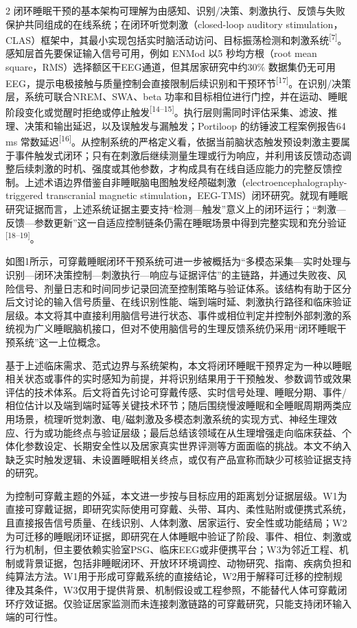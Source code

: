 \documentclass[UTF8,zihao=5,fontset=none]{ctexart}
\newcommand{\hei}{\CJKfamily{hei}}
\newcommand{\leveltwo}[1]{%
  \par\noindent{\hei\fontsize{10.5pt}{15.6pt}\selectfont\bfseries #1\par}}
\newcommand{\refcite}[1]{\nolinebreak[4]\textsuperscript{[#1]}}
\begin{document}
\begin{multicols}{2}
闭环睡眠干预的基本架构可理解为由感知、识别/决策、刺激执行、反馈与失败保护共同组成的在线系统；在闭环听觉刺激（closed-loop auditory stimulation，CLAS）框架中，其最小实现包括实时脑活动访问、目标振荡检测和刺激系统\refcite{7}。感知层首先要保证输入信号可用，例如 ENMod 以5 秒均方根（root mean square，RMS）选择额区干EEG通道，但其居家研究中约30\% 数据集仍无可用EEG，提示电极接触与质量控制会直接限制后续识别和干预环节\refcite{17}。在识别/决策层，系统可联合NREM、SWA、beta 功率和目标相位进行门控，并在运动、睡眠阶段变化或觉醒时拒绝或停止触发\refcite{14--15}。执行层则需同时评估采集、滤波、推理、决策和输出延迟，以及误触发与漏触发；Portiloop 的纺锤波工程案例报告64 ms 常数延迟\refcite{16}。从控制系统的严格定义看，依据当前脑状态触发预设刺激主要属于事件触发式闭环；只有在刺激后继续测量生理或行为响应，并利用该反馈动态调整后续刺激的时机、强度或其他参数，才构成具有在线自适应能力的完整反馈控制。上述术语边界借鉴自非睡眠脑电图触发经颅磁刺激（electroencephalography-triggered transcranial magnetic stimulation，EEG-TMS）闭环研究。就现有睡眠研究证据而言，上述系统证据主要支持“检测—触发”意义上的闭环运行；“刺激—反馈—参数更新”这一自适应控制链条仍需在睡眠场景中得到完整实现和充分验证\refcite{18--19}。

如图1所示，可穿戴睡眠闭环干预系统可进一步被概括为“多模态采集—实时处理与识别—闭环决策控制—刺激执行—响应与证据评估”的主链路，并通过失败夜、风险信号、剂量日志和时间同步记录回流至控制策略与验证体系。该结构有助于区分后文讨论的输入信号质量、在线识别性能、端到端时延、刺激执行路径和临床验证层级。本文将其中直接利用脑信号进行状态、事件或相位判定并控制外部刺激的系统视为广义睡眠脑机接口，但对不使用脑信号的生理反馈系统仍采用“闭环睡眠干预系统”这一上位概念。\par

\leveltwo{1.4 本文综述范围与结构安排}

基于上述临床需求、范式边界与系统架构，本文将闭环睡眠干预界定为一种以睡眠相关状态或事件的实时感知为前提，并将识别结果用于干预触发、参数调节或效果评估的技术体系。后文将首先讨论可穿戴传感、实时信号处理、睡眠分期、事件/相位估计以及端到端时延等关键技术环节；随后围绕慢波睡眠和全睡眠周期两类应用场景，梳理听觉刺激、电/磁刺激及多模态刺激系统的实现方式、神经生理效应、行为或功能终点与验证层级；最后总结该领域在从生理增强走向临床获益、个体化参数设定、长期安全性以及居家真实世界评测等方面面临的挑战。本文不纳入缺乏实时触发逻辑、未设置睡眠相关终点，或仅有产品宣称而缺少可核验证据支持的研究。

为控制可穿戴主题的外延，本文进一步按与目标应用的距离划分证据层级。W1为直接可穿戴证据，即研究实际使用可穿戴、头带、耳内、柔性贴附或便携式系统，且直接报告信号质量、在线识别、人体刺激、居家运行、安全性或功能结局；W2为可迁移的睡眠闭环证据，即研究在人体睡眠中验证了阶段、事件、相位、刺激或行为机制，但主要依赖实验室PSG、临床EEG或非便携平台；W3为邻近工程、机制或背景证据，包括非睡眠闭环、开放环环境调控、动物研究、指南、疾病负担和纯算法方法。W1用于形成可穿戴系统的直接结论，W2用于解释可迁移的控制规律及其条件，W3仅用于提供背景、机制假设或工程参照，不能替代人体可穿戴闭环疗效证据。仅验证居家监测而未连接刺激链路的可穿戴研究，只能支持闭环输入端的可行性。


\end{multicols}
\end{document}
